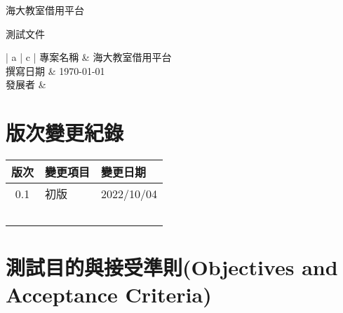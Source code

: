 \documentclass{article}
\begin{document}
\begin{titlepage}
	\centering

	{\huge 海大教室借用平台}

	\vfill

	{\huge 測試文件}

	\vfill

	\begin{Large}
		\begin{center}
			\begin{tabular}{| a | c |}
				\hline
				專案名稱 & 海大教室借用平台               \\ \hline
				撰寫日期 & \today                 \\ \hline
				發展者  &  \\ \hline
			\end{tabular}
		\end{center}
	\end{Large}
\end{titlepage}


\section*{版次變更紀錄}

\begin{tabularx}{\textwidth}{| c | X | X |}
	\rowcolor{LightGray}
	\hline
	版次  & 變更項目 & 變更日期       \\ \hline
	0.1 & 初版   & 2022/10/04 \\ \hline
	    &      &            \\ \hline
	    &      &            \\ \hline
	    &      &            \\ \hline
	    &      &            \\ \hline
	    &      &            \\ \hline
\end{tabularx}

\newpage

\begin{center}
	\tableofcontents
\end{center}

\newpage

\section[測試目的與接受準則(OBJECTIVES AND ACCEPTANCE CRITERIA)]{測試目的與接受準則(Objectives and Acceptance Criteria)}
\end{document}
